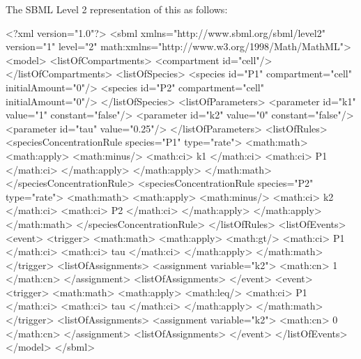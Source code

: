 \documentclass[10pt,twocolumntoc]{cekarticle}
\begin{document}
The SBML Level 2 representation of this as follows:

\begin{example}
<?xml version="1.0"?>
<sbml xmlns="http://www.sbml.org/sbml/level2" version="1" level="2"
      math:xmlns="http://www.w3.org/1998/Math/MathML">
    <model>
        <listOfCompartments>
            <compartment id="cell"/>
        </listOfCompartments>
        <listOfSpecies>
            <species id="P1" compartment="cell" initialAmount="0"/>
            <species id="P2" compartment="cell" initialAmount="0"/>
        </listOfSpecies>
        <listOfParameters>
            <parameter id="k1" value="1" constant="false"/>
            <parameter id="k2" value="0" constant="false"/>
            <parameter id="tau" value="0.25"/>
        </listOfParameters>
        <listOfRules>
            <speciesConcentrationRule species="P1" type="rate">
                <math:math>
                    <math:apply>
                        <math:minus/>
                        <math:ci> k1 </math:ci>
                        <math:ci> P1 </math:ci>
                        </math:apply>
                    </math:apply>
                </math:math>
            </speciesConcentrationRule>
            <speciesConcentrationRule species="P2" type="rate">
                <math:math>
                    <math:apply>
                        <math:minus/>
                        <math:ci> k2 </math:ci>
                        <math:ci> P2 </math:ci>
                        </math:apply>
                    </math:apply>
                </math:math>
            </speciesConcentrationRule>
        </listOfRules>
        <listOfEvents>
            <event>
                <trigger>
                    <math:math>
                        <math:apply>
                            <math:gt/>
                            <math:ci> P1 </math:ci>
                            <math:ci> tau </math:ci>
                        </math:apply>
                    </math:math>
                </trigger>
                <listOfAssignments>
                    <assignment variable="k2">
                        <math:cn> 1 </math:cn>
                    </assignment>
                <listOfAssignments>
            </event>
            <event>
                <trigger>
                    <math:math>
                        <math:apply>
                            <math:leq/>
                            <math:ci> P1 </math:ci>
                            <math:ci> tau </math:ci>
                        </math:apply>
                    </math:math>
                </trigger>
                <listOfAssignments>
                    <assignment variable="k2">
                        <math:cn> 0 </math:cn>
                    </assignment>
                <listOfAssignments>
            </event>
        </listOfEvents>
    </model>
</sbml>
\end{example}
\end{document}
